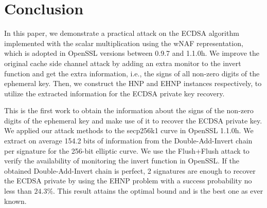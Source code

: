 \section{Conclusion}
\label{sec:conclusion}
In this paper, we demonstrate a practical attack on the ECDSA algorithm implemented  with the scalar multiplication using the wNAF representation, which is adopted in OpenSSL versions between 0.9.7 and 1.1.0h.
We improve the original cache side channel attack
 by adding an extra monitor to the invert function and get the extra information, i.e., the signs of all non-zero digits of the ephemeral key. 
Then, we construct the HNP and EHNP instances respectively,  to utilize the extracted information for the ECDSA private key recovery. 


This is the first work to obtain the information about the signs of the non-zero digits of the ephemeral key and make use of it to recover the ECDSA private key.
We applied our attack methods to the secp256k1 curve in OpenSSL 1.1.0h.
We extract on average 154.2 bits of information from the Double-Add-Invert chain per signature for the 256-bit elliptic curve. We use the Flush+Flush attack to verify the availability of monitoring the invert function in OpenSSL.
If the obtained Double-Add-Invert chain is perfect,
2 signatures are enough to recover the ECDSA private by using the EHNP problem with a success probability no less than $24.3\%$.
This result attains the optimal bound and is the best one as ever known.






